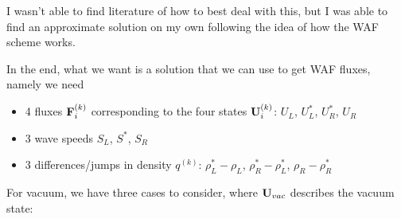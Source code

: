 I wasn't able to find literature of how to best deal with this, but I was able to find an approximate solution on my own following the idea of how the WAF scheme works.

In the end, what we want is a solution that we can use to get WAF fluxes, namely we need

\begin{itemize}
	\item 4 fluxes $\mathbf{F}_{i}^{(k)}$ corresponding to the four states $\mathbf{U}_{i}^{(k)}$: $U_L$, $U_L^*$, $U_R^*$, $U_R$
	\item 3 wave speeds $S_L$, $S^*$, $S_R$
	\item 3 differences/jumps in density $q^{(k)}$: $\rho_L^* - \rho_L$, $\rho_R^* - \rho_L^*$, $\rho_R - \rho_R^*$
\end{itemize}

For vacuum, we have three cases to consider, where $\mathbf{U}_{vac}$ describes the vacuum state:


